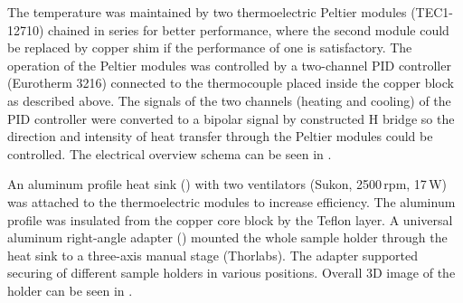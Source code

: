\begin{figure}
	\centering
	\caption[%
		Teflon insulation of thermostated cell holder.%
	]{%
	}
	\label{\figlabel{thermostated_holder:insulation_drawing}}
\end{figure}

The temperature was maintained by two thermoelectric Peltier modules
(TEC1-12710) chained in series for better performance, where the second module
could be replaced by copper shim if the performance of one is satisfactory.
The operation of the Peltier modules was controlled by a two-channel PID
controller (Eurotherm 3216) connected to the thermocouple placed inside the
copper block as described above.
The signals of the two channels (heating and cooling) of the PID controller
were converted to a bipolar signal by constructed H bridge so the direction
and intensity of heat transfer through the Peltier modules could be controlled.
The electrical overview schema can be seen in
.

\begin{figure}
	\centering
	
	\caption[%
		Electrical schema of the thermostated cell holder.%
	]{%
	}
	\label{\figlabel{thermostated_holder:electrical_schema}}
\end{figure}

An aluminum profile heat sink
()
with two ventilators (Sukon, 2500\,rpm, 17\,W) was attached to the
thermoelectric modules to increase efficiency.
The aluminum profile was insulated from the copper core block by the Teflon
layer.
A universal aluminum right-angle adapter
()
mounted the whole sample holder through the heat sink to a three-axis manual
stage (Thorlabs).
The adapter supported securing of different sample holders in various
positions. Overall 3D image of the holder can be seen in
.

\begin{figure}
	\centering
	\caption[%
		Teflon cover of sample cell and universal aluminum right-angle
		adapter for thermostated sample holder.%
	]{%
	}
	\label{\figlabel{thermostated_holder:stand_drawing}}
\end{figure}

